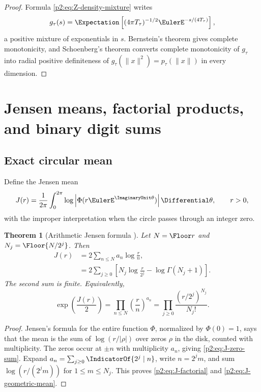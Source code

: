 \documentclass[11pt]{article}
\newtheorem{theorem}{Theorem}[section]
\theoremstyle{definition}
\theoremstyle{remark}
\begin{document}
\begin{proof}
Formula \eqref{p2:eq:Z-density-mixture} writes
\[
 g_\tau(s)=\Expectation\left[(4\pi T_\tau)^{-1/2}
                    \EulerE^{-s/(4T_\tau)}\right],
\]
a positive mixture of exponentials in $s$.  Bernstein's theorem gives complete monotonicity,
and Schoenberg's theorem converts complete monotonicity of $g_\tau$ into radial positive
definiteness of $g_\tau(\|x\|^2)=p_\tau(\|x\|)$ in every dimension.
\end{proof}

\section{Jensen means, factorial products, and binary digit sums}
\label{p2:sec:jensen}

\subsection{Exact circular mean}

Define the Jensen mean
\begin{equation}
 J(r)=\frac1{2\pi}\int_0^{2\pi}
 \log\left|\Phi(r\EulerE^{\ImaginaryUnit\theta})\right|\Differential\theta,
 \qquad r>0,                                             \label{p2:eq:J-def}
\end{equation}
with the improper interpretation when the circle passes through an integer zero.

\begin{theorem}[Arithmetic Jensen formula \New]
Let $N=\Floor r$ and $N_j=\Floor{N/2^j}$.  Then
\begin{align}
 J(r)
 &=2\sum_{n\le N}a_n\log\frac{r}{n},                     \label{p2:eq:J-zero-sum}\\
 &=2\sum_{j\ge0}
 \left[N_j\log\frac{r}{2^j}-\log\Gamma(N_j+1)\right].   \label{p2:eq:J-factorial}
\end{align}
The second sum is finite.  Equivalently,
\begin{equation}
 \boxed{\quad
 \exp\left(\frac{J(r)}2\right)
 =\prod_{n\le N}\left(\frac{r}{n}\right)^{a_n}
 =\prod_{j\ge0}\frac{(r/2^j)^{N_j}}{N_j!}.
 \quad}                                                  \label{p2:eq:J-geometric-mean}
\end{equation}
\end{theorem}

\begin{proof}
Jensen's formula for the entire function $\Phi$, normalized by $\Phi(0)=1$, says that the
mean is the sum of $\log(r/|\rho|)$ over zeros $\rho$ in the disk, counted with multiplicity.
The zeros occur at $\pm n$ with multiplicity $a_n$, giving \eqref{p2:eq:J-zero-sum}.  Expand
$a_n=\sum_{j\ge0}\IndicatorOf{2^j\mid n}$, write $n=2^jm$, and sum
$\log(r/(2^jm))$ for $1\le m\le N_j$.  This proves \eqref{p2:eq:J-factorial} and
\eqref{p2:eq:J-geometric-mean}.
\end{proof}
\end{document}
